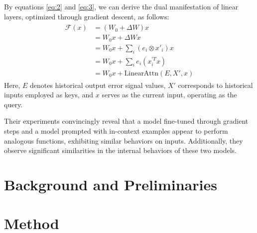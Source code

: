 \documentclass[runningheads]{llncs}
\begin{document}
By equations \eqref{eq:2} and \eqref{eq:3}, we can derive the dual manifestation of linear layers, optimized through gradient descent, as follows:
\begin{align}
  \begin{split}
    \mathcal{F}(x) &= (W_0 + \Delta W)x \\
    &= W_0x + \Delta Wx \\
    &= W_0x + \sum_{i} (e_i \otimes x'_i)x \\
    &= W_0x + \sum_{i} e_i(x^{'T}_ix) \\
    &= W_0x + \text{LinearAttn}(E, X', x)
  \end{split}
  \label{eq:4}
\end{align}
Here, $E$ denotes historical output error signal values, $X'$ corresponds to historical inputs employed as keys, and $x$ serves as the current input, operating as the query.

Their experiments convincingly reveal that a model fine-tuned through gradient steps and a model prompted with in-context examples appear to perform analogous functions, exhibiting similar behaviors on inputs. 
Additionally, they observe significant similarities in the internal behaviors of these two models.


\section{Background and Preliminaries}


\section{Method}


 
 
\end{document}

